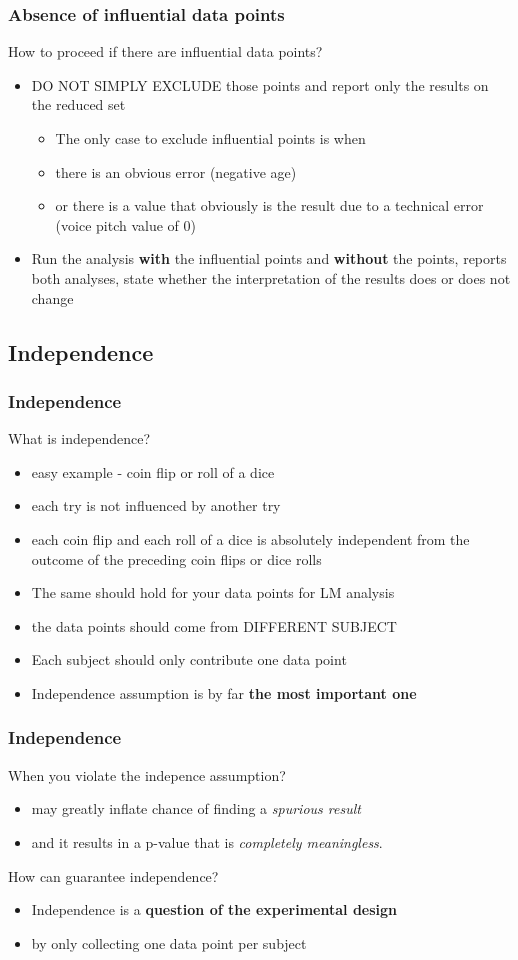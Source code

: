 \documentclass{beamer}\usepackage[]{graphicx}\usepackage[]{color}
\begin{document}
\begin{frame}
\frametitle{Absence of influential data points}
How to proceed if there are influential data points?
\begin{itemize}
\item DO NOT SIMPLY EXCLUDE those points and report only the results on the reduced set
	\begin{itemize}
	\item The only case to exclude influential points is when
	\item there is an obvious error (negative age)
	\item or there is a value that obviously is the result due to a technical error (voice pitch value of 0)
	\end{itemize}
\item Run the analysis \textbf{with} the influential points and \textbf{without} the points, reports both analyses, state whether the interpretation of the results does or does not change 
\end{itemize}
\end{frame}

\subsection{Independence}
\begin{frame}
\frametitle{Independence}
What is independence?
\begin{itemize}
\item easy example - coin flip or roll of a dice
\item each try is not influenced by another try
\item each coin flip and each roll of a dice is absolutely independent from the outcome of the preceding coin flips or dice rolls
\item The same should hold for your data points for LM analysis
\item \alert{the data points should come from DIFFERENT SUBJECT}
\item Each subject should only contribute one data point
\item Independence assumption is by far \textbf{the most important one}
\end{itemize}
\end{frame}


\begin{frame}
\frametitle{Independence}
When you violate the indepence assumption?
\begin{itemize}
\item may greatly inflate chance of finding a \textit{spurious result}
\item and it results in a p-value that is \textit{completely meaningless}.
\end{itemize}

How can guarantee independence?
\begin{itemize}
\item Independence is a \textbf{question of the experimental design}
\item by only collecting one data point per subject
\end{itemize}
\end{frame}
\end{document}
